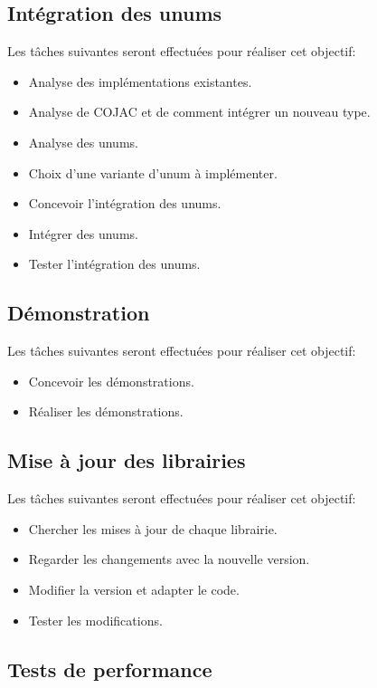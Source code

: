 \subsection{Intégration des unums}

Les tâches suivantes seront effectuées pour réaliser cet objectif:
\begin{itemize}
    \item Analyse des implémentations existantes.
    \item Analyse de COJAC et de comment intégrer un nouveau type.
    \item Analyse des unums.
    \item Choix d'une variante d'unum à implémenter.
    \item Concevoir l'intégration des unums.
    \item Intégrer des unums.
    \item Tester l'intégration des unums.
\end{itemize}

\subsection{Démonstration}

Les tâches suivantes seront effectuées pour réaliser cet objectif:
\begin{itemize}
    \item Concevoir les démonstrations.
    \item Réaliser les démonstrations.
\end{itemize}

\subsection{Mise à jour des librairies}

Les tâches suivantes seront effectuées pour réaliser cet objectif:
\begin{itemize}
    \item Chercher les mises à jour de chaque librairie.
    \item Regarder les changements avec la nouvelle version.
    \item Modifier la version et adapter le code.
    \item Tester les modifications.
\end{itemize}

\subsection{Tests de performance}

